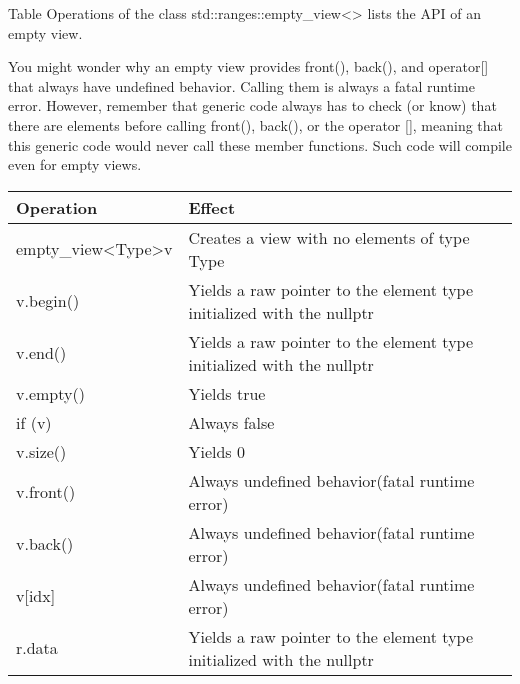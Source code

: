 
Table Operations of the class std::ranges::empty\_view<> lists the API of an empty view.

You might wonder why an empty view provides front(), back(), and operator[] that always have undefined behavior. Calling them is always a fatal runtime error. However, remember that generic code always has to check (or know) that there are elements before calling front(), back(), or the operator [], meaning that this generic code would never call these member functions. Such code will compile even for empty views.

\begin{longtable}[c]{|l|l|}
\hline
\textbf{Operation} & \textbf{Effect}                                                       \\ \hline
\endfirsthead
%
\endhead
%
empty\_view\textless{}Type\textgreater v & Creates a view with no elements of type Type                          \\ \hline
v.begin()                                & Yields a raw pointer to the element type initialized with the nullptr \\ \hline
v.end()            & Yields a raw pointer to the element type initialized with the nullptr \\ \hline
v.empty()          & Yields true                                                           \\ \hline
if (v)             & Always false                                                          \\ \hline
v.size()           & Yields 0                                                              \\ \hline
v.front()          & Always undefined behavior(fatal runtime error)                        \\ \hline
v.back()           & Always undefined behavior(fatal runtime error)                        \\ \hline
v{[}idx{]}         & Always undefined behavior(fatal runtime error)                        \\ \hline
r.data             & Yields a raw pointer to the element type initialized with the nullptr \\ \hline
\end{longtable}

